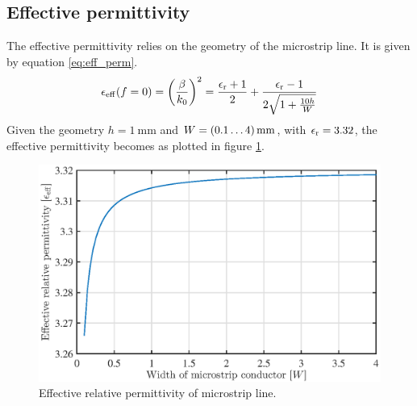 \subsection{Effective permittivity}
The effective permittivity relies on the geometry of the microstrip line.
It is given by equation \ref{eq:eff_perm}.
\begin{equation}
\epsilon_{\rm eff}(f=0) = \left(\frac{\beta}{k_{\rm 0}} \right)^2 = \frac{\epsilon_{\rm r} + 1}{2} + \frac{\epsilon_{\rm r} - 1}{2 \sqrt{1+\frac{10h}{W}}}
\label{eq:eff_perm}
\end{equation}
Given the geometry $h = \SI{1}{\milli\meter}$ and $W = \mSIrange{0.1}{4}{\milli\meter}$, with $\epsilon_{\rm r} = 3.32$, the effective permittivity becomes as plotted in figure \ref{fig:eff_rel_perm}.
\begin{figure}[h t b p]
	\centering
	\includegraphics[width=\textwidth,keepaspectratio]{figures/eff_rel_perm_t7.eps}
	\caption{Effective relative permittivity of microstrip line.}
	\label{fig:eff_rel_perm}
\end{figure}